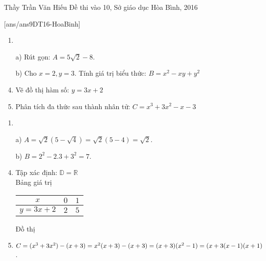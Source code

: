 \begin{name}
{Thầy  Trần Văn Hiếu}
{Đề thi vào 10, Sở giáo dục Hòa Bình, 2016}
\end{name}
\setcounter{ex}{0}
[ans/ans9DT16-HoaBinh]
\begin{ex}%
    \hfill
    \begin{enumerate}[1)]
    \item
        \item[a)] Rút gọn: $A=5\sqrt{2}-8$.
        \item[b)] Cho $x=2,y=3$. Tính giá trị biểu thức: $B=x^2-xy+y^2$
        \item Vẽ đồ thị hàm số: $y=3x+2$
        \item Phân tích đa thức sau thành nhân tử: $C=x^3+3x^2-x-3$
    \end{enumerate}
\loigiai
    {
    \begin{enumerate}[1)]
    \item
    \item[a)] $A=\sqrt{2}(5-\sqrt{4})=\sqrt{2}(5-4)=\sqrt{2}$.
    \item[b)] $B=2^2-2.3+3^2=7$.
    \item Tập xác định: $\mathbb{D}=\mathbb{R}$\\
    Bảng giá trị
    \begin{center}
    \begin{tabular}{|c|c|c|}
    \hline
    $x$ & $0$ & $1$ \\ \hline
    $y=3x+2$ & $2$ & $5$ \\ \hline    
    \end{tabular}
    \end{center}
            Đồ thị\\
	\begin{center}
	\end{center}
	\item 
	$
	 C=(x^3+3x^2)-(x+3)\\
	 =x^2(x+3)-(x+3)\\
	 =(x+3)(x^2-1)\\
	 =(x+3(x-1)(x+1)$.
	 
    \end{enumerate}
    }
\end{ex}

